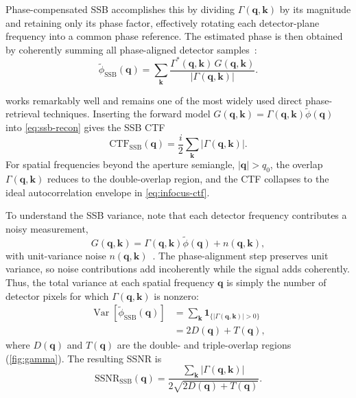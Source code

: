 \documentclass[pdflatex,sn-aps,iicol]{sn-jnl}%
\begin{document}
Phase-compensated SSB accomplishes this by dividing $\Gamma(\boldsymbol{q},\boldsymbol{k})$ by its magnitude and retaining only its phase factor, effectively rotating each detector-plane frequency into a common phase reference.
The estimated phase is then obtained by coherently summing all phase-aligned detector samples~\cite{Yang_2016}:
\begin{equation}
  \tilde{\phi}_{\text{SSB}}(\boldsymbol{q}) = \sum_{\boldsymbol{k}} \frac{\Gamma^{*}(\boldsymbol{q},\boldsymbol{k})\,G(\boldsymbol{q},\boldsymbol{k})} {\lvert \Gamma(\boldsymbol{q},\boldsymbol{k}) \rvert}.
  \label{eq:ssb-recon}
\end{equation}

 works remarkably well and remains one of the most widely used direct phase-retrieval techniques.
Inserting the forward model $G(\boldsymbol{q},\boldsymbol{k})=\Gamma(\boldsymbol{q},\boldsymbol{k})\tilde{\phi}(\boldsymbol{q})$ into \cref{eq:ssb-recon} gives the SSB CTF~\cite{Yang_2016}
\begin{equation}
  \mathrm{CTF}_{\text{SSB}}(\boldsymbol{q}) = \frac{i}{2} \sum_{\boldsymbol{k}} \lvert \Gamma(\boldsymbol{q},\boldsymbol{k}) \rvert.
  \label{eq:ctf-ssb}
\end{equation}
For spatial frequencies beyond the aperture semiangle, $\lvert \boldsymbol{q} \rvert > q_0$, the overlap $\Gamma(\boldsymbol{q},\boldsymbol{k})$ reduces to the double-overlap region, and the CTF collapses to the ideal autocorrelation envelope in \cref{eq:infocus-ctf}.

To understand the SSB variance, note that each detector frequency contributes a noisy measurement,
\begin{equation}
  G(\boldsymbol{q},\boldsymbol{k}) = \Gamma(\boldsymbol{q},\boldsymbol{k})\tilde{\phi}(\boldsymbol{q}) + n(\boldsymbol{q},\boldsymbol{k}),
  \label{eq:noise-model}
\end{equation}
with unit-variance noise $n(\boldsymbol{q},\boldsymbol{k})$~\cite{Bennemann_2025}.
The phase-alignment step preserves unit variance, so noise contributions add incoherently while the signal adds coherently.
Thus, the total variance at each spatial frequency $\boldsymbol{q}$ is simply the number of detector pixels for which $\Gamma(\boldsymbol{q},\boldsymbol{k})$ is nonzero:
\begin{align}
  \operatorname{Var}\!\left[\tilde{\phi}_{\text{SSB}}(\boldsymbol{q})\right] &= \sum_{\boldsymbol{k}} \mathbf{1}_{\{\lvert \Gamma(\boldsymbol{q},\boldsymbol{k}) \rvert > 0\}} \nonumber\\
  &= 2 D(\boldsymbol{q})+T(\boldsymbol{q}), 
  \label{eq:var-ssb}
\end{align}
where $D(\boldsymbol{q})$ and $T(\boldsymbol{q})$ are the double- and triple-overlap regions (\cref{fig:gamma}).
The resulting SSNR is~\cite{Bennemann_2025,Varnavides_2025_ssnr}
\begin{equation}
  \mathrm{SSNR}_{\text{SSB}}(\boldsymbol{q}) = \frac{\sum_{\boldsymbol{k}}\lvert \Gamma(\boldsymbol{q},\boldsymbol{k}) \rvert} {2\sqrt{2D(\boldsymbol{q})+T(\boldsymbol{q})}} .
  \label{eq:ssb-ssnr}
\end{equation}
\end{document}
